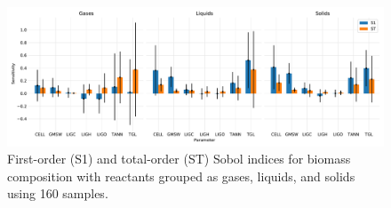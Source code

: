 \begin{figure}[H]
    \centering
    \includegraphics[width=\textwidth]{figures/sa-bar-n10.pdf}
    \caption{First-order (S1) and total-order (ST) Sobol indices for biomass composition with reactants grouped as gases, liquids, and solids using 160 samples.}
\end{figure}
